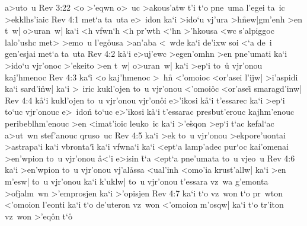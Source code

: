 a>uto~u\bibvsend
\vs Rev 3:22
<o
>'eqwn
o>~uc
>akous'atw
t'i
t`o
pne~uma
l'egei
ta~ic
>ekklhs'iaic\bibvsend
\vs Rev 4:1
met`a
ta~uta
e>~idon
ka`i
>ido`u
vj'ura
>h\r{n}ew|gm'enh
>en
t~w|
o>uran~w|
ka`i
<h
vfwn`h
<h
pr'wth
<`hn
>'hkousa
<wc
s'alpiggoc
lalo'ushc
met>
>emo~u
l'eg\r{o}usa
>an'aba
<~wde
ka`i
de'ixw
soi
<`a
de~i
gen'esjai
met`a
ta~uta\bibvsend
\vs Rev 4:2
k\r{a}`i
e>uj'ewc
>egen'omhn
>en
pne'umati
ka`i
>ido`u
vjr'onoc
>'ekeito
>en
t~w|
o>uran~w|
ka`i
>ep`i
to~u\r{}
vjr'onou
kaj'hmenoc\bibvsend
\vs Rev 4:3
ka`i\r{}
<o
kaj'hmenoc
>~h\r{n}
<'omoioc
<or'asei
l'ijw|
>i'aspidi
ka`i
sard'i\r{n}w|
ka`i
>~iric
kukl'ojen
to~u
vjr'onou
<'omoi\r{o}c
<or'asei\r{}
smaragd'inw|\bibvsend
\vs Rev 4:4
k\r{a}`i
kukl'ojen
to~u
vjr'onou
vjr'on\r{o}i
e>'ikosi
k\r{a}`i
t'essarec
ka`i
>ep`i
to`uc
vjr'onouc
e>~idon\r{}
to`uc
e>'ikosi
k\r{a}`i
t'essarac
presbut'erouc
kajhm'enouc
peribeblhm'enouc
>en
<imat'ioic
leuko~ic
ka`i
>'e\r{s}qon
>ep`i
t`ac
kefal`ac
a>ut~wn
stef'anouc
qruso~uc\bibvsend
\vs Rev 4:5
ka`i
>ek
to~u
vjr'onou
>ekpore'uontai
>astrapa`i
ka`i
vbronta`i\r{}
ka`i
vfwna`i
ka`i
<ept`a
lamp'adec
pur`oc
kai'omenai
>en'wpion
to~u
vjr'onou
\r{a}<'i
e>isin
\r{t}`a
<ept`a
pne'umata
to~u
vjeo~u\bibvsend
\vs Rev 4:6
ka`i
>en'wpion
to~u
vjr'onou
vj'al\r{a}ssa
<ual'inh
<omo'ia
krust'allw|
ka`i
>en
m'esw|
to~u
vjr'onou
ka`i
k'uklw|
to~u
vjr'onou
t'essara
vz~wa
g'emonta
>ofjalm~wn
>'emprosjen
ka`i
>'opisjen\bibvsend
\vs Rev 4:7
ka`i
t`o
vz~won
t`o
pr~wton
<'omoion
l'eonti
ka`i
t`o
de'uteron
vz~won
<'omoion
m'osqw|
ka`i
t`o
tr'iton
vz~won
>'eq\r{o}n
t`o\r{}
